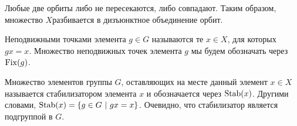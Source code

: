	\begin{lemma} 
		Любые две орбиты либо не пересекаются, либо совпадают. Таким образом, множество $X$разбивается в дизъюнктное объединение орбит.
	\end{lemma}

	\begin{definition} 
		 Неподвижными точками элемента $g \in G$ называются те $x \in X$, для которых $gx = x$. Множество неподвижных точек элемента $g$ мы будем обозначать через $\operatorname{Fix}(g)$.
	\end{definition}

	\begin{definition} 
	 	Множество элементов группы $G$, оставляющих на месте данный элемент $x \in X$ называется стабилизатором элемента $x$ и обозначается через $\operatorname{Stab}(x)$. Другими словами, $\Stab(x) = \{ g \in G \ \vert \ gx = x \}$. Очевидно, что стабилизатор является подгруппой в $G$.
	 \end{definition} 



	

	



	

	






	

	




